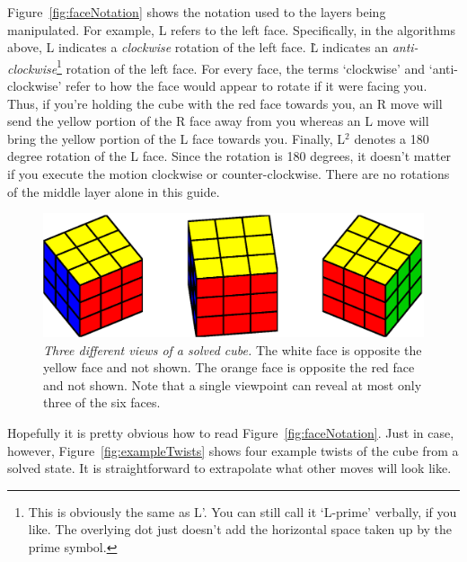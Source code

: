 \documentclass[paper=a4, fontsize=11pt, parskip=full]{scrartcl} %
\newcommand*{\A}{\fontfamily{pcr}\selectfont} %
\newcommand{\2}{\ensuremath{^2}} %
\begin{document}
Figure~\ref{fig:faceNotation} shows the notation used to the layers 
being manipulated. For example, {\A L} refers to the left face. 
Specifically, in the algorithms above, {\A L} indicates a \textit{clockwise} 
rotation of the left face.  {\A \.{L}} indicates an \textit{anti-clockwise}\footnote{This is obviously
the same as {\A L'}. You can still call it `L-prime' verbally, if you like. The overlying dot just doesn't add the horizontal space taken up by the prime symbol.}
rotation of the left face. For every face, the terms `clockwise'  and `anti-clockwise' 
refer to how the face would appear to rotate if it were facing you. Thus, if you're holding the 
cube with the red face towards you, an {\A R} move will send
 the yellow portion of the {\A R} face away from you whereas an {\A L} move will 
 bring the yellow portion of  the {\A L} face towards you. Finally, {\A L\2} denotes 
 a 180 degree rotation of the {\A L} face. Since the rotation is 180 degrees, it 
 doesn't matter if you execute the motion clockwise or counter-clockwise. There are no 
 rotations of the middle layer alone in this guide. 

\begin{figure}[h]
\centering
\includegraphics[width=4.5in]{threeViewsOfSolvedCube.eps}
\caption{\textit{Three different views of a solved cube.} The white face is opposite
the yellow face and not shown. The orange face is opposite the red face and not shown. Note that a 
single viewpoint can reveal at most only three of the six faces.}
\label{fig:solved}
\end{figure}


 Hopefully it is pretty obvious how to read Figure~\ref{fig:faceNotation}. Just in case, 
 however, Figure~\ref{fig:exampleTwists} shows four example twists of the cube from
 a solved state. It is straightforward to extrapolate what other moves will look like. 


\clearpage
\end{document}
